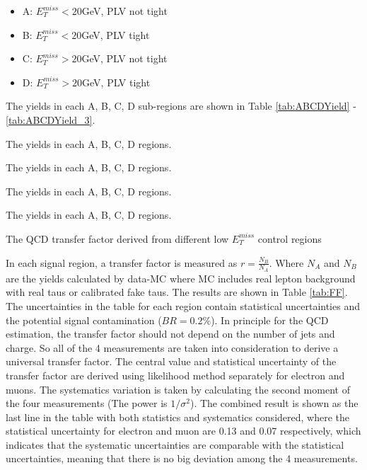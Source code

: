 \begin{itemize}
	\item A: $E_T^{miss}<20$GeV, PLV not tight
	\item B: $E_T^{miss}<20$GeV, PLV tight
	\item C: $E_T^{miss}>20$GeV, PLV not tight
	\item D: $E_T^{miss}>20$GeV, PLV tight
\end{itemize}

The yields in each A, B, C, D sub-regions are shown in Table \ref{tab:ABCDYield} - \ref{tab:ABCDYield_3}.

\begin{table}
\caption{The yields in each A, B, C, D regions.}
\label{tab:ABCDYield}

\end{table}

\begin{table}
\caption{The yields in each A, B, C, D regions.}
\label{tab:ABCDYield_1}

\end{table}

\begin{table}
\caption{The yields in each A, B, C, D regions.}
\label{tab:ABCDYield_2}

\end{table}

\begin{table}
\caption{The yields in each A, B, C, D regions.}
\label{tab:ABCDYield_3}

\end{table}

\begin{table}
\caption{The QCD transfer factor derived from different low $E_T^{miss}$ control regions}
\label{tab:FF}

\end{table}

In each signal region, a transfer factor is measured as $r=\frac{N_B}{N_A}$. Where $N_A$ and $N_B$ are the yields calculated by data-MC where MC includes real lepton background with real taus or calibrated fake taus. The results are shown in Table \ref{tab:FF}. The uncertainties in the table for each region contain statistical uncertainties and the potential signal contamination ($BR=0.2\%$). In principle for the QCD estimation, the transfer factor should not depend on the number of jets and charge. So all of the 4 measurements are taken into consideration to derive a universal transfer factor. The central value and statistical uncertainty of the transfer factor are derived using likelihood method separately for electron and muons. The systematics variation is taken by calculating the second moment of the four measurements (The power is $1/\sigma^2$). The combined result is shown as the last line in the table with both statistics and systematics considered, where the statistical uncertainty for electron and muon are 0.13 and 0.07 respectively, which indicates that the systematic uncertainties are comparable with the statistical uncertainties, meaning that there is no big deviation among the 4 measurements.


